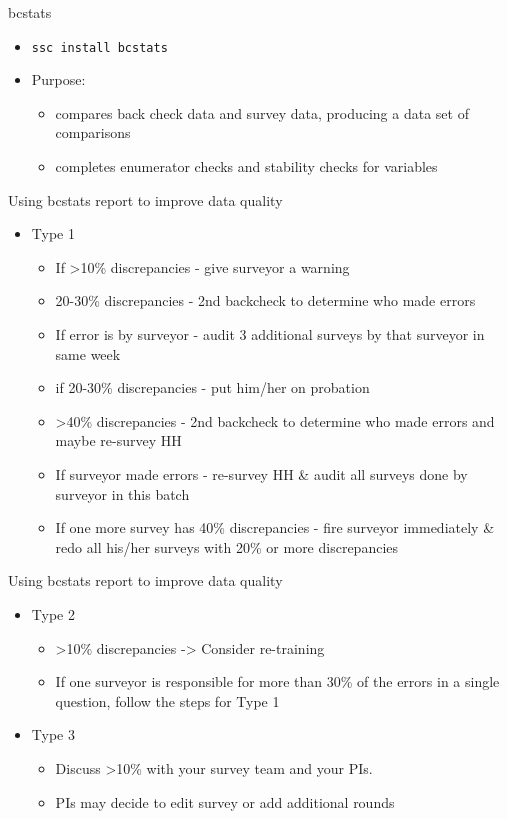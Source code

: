 \documentclass[aspectratio=169]{beamer}
\begin{document}
\begin{frame}{bcstats}
	\begin{itemize}
		\item \texttt{ssc install bcstats}
		\item Purpose:
		\begin{itemize}
			\item compares back check data and survey data, producing a data set of comparisons
			\item completes enumerator checks and stability checks for variables
		\end{itemize}
	\end{itemize}
\end{frame}

\begin{frame}{Using bcstats report to improve data quality}
	\begin{itemize}
		\item Type 1
			\begin{itemize}
				\item If >10\% discrepancies  - give surveyor a warning
				\item 20-30\% discrepancies - 2nd backcheck to determine who made errors
				\item If error is by surveyor  - audit 3 additional surveys by that surveyor in same week 
				\item if 20-30\% discrepancies -  put him/her on probation
				\item >40\% discrepancies - 2nd backcheck to determine who made errors and maybe re-survey HH 
				\item If surveyor made errors - re-survey HH \& audit all surveys done by surveyor in this batch
				\item If one more survey has 40\% discrepancies - fire surveyor immediately \& redo all his/her surveys with 20\% or more discrepancies
		\end{itemize}
	\end{itemize}
\end{frame}

\begin{frame}{Using bcstats report to improve data quality}
	\begin{itemize}
		\item Type 2
		\begin{itemize}
			\item >10\% discrepancies -> Consider re-training
			\item If one surveyor is responsible for more than 30\% of the errors in a single question, follow the steps for Type 1
		\end{itemize}
		\item Type 3
		\begin{itemize}
			\item Discuss >10\% with your survey team and your PIs. 
			\item PIs may decide to edit survey or add additional rounds
		\end{itemize}
	\end{itemize}
\end{frame}
\end{document}
